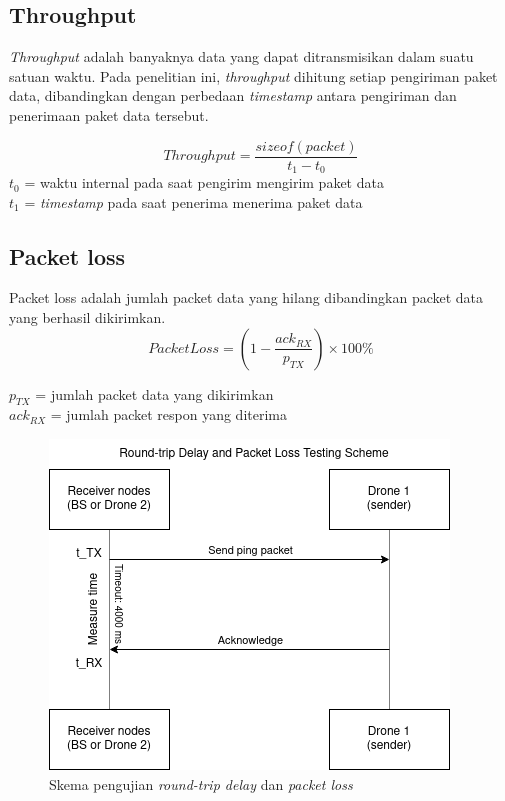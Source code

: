 \subsection{Throughput}
\textit{Throughput} adalah banyaknya data yang dapat ditransmisikan dalam suatu satuan waktu. Pada penelitian ini, \textit{throughput} dihitung setiap pengiriman paket data, dibandingkan dengan perbedaan \textit{timestamp} antara pengiriman dan penerimaan paket data tersebut.

\begin{equation}
	Throughput = \frac{sizeof(packet)}{t_1 - t_0}
\end{equation}
$t_0$ = waktu internal pada saat pengirim mengirim paket data\\
$t_1$ = \textit{timestamp} pada saat penerima menerima paket data

\subsection{Packet loss}
Packet loss adalah jumlah packet data yang hilang dibandingkan packet data yang berhasil dikirimkan.
\begin{equation}
	Packet Loss = (1 - \frac{ack_{RX}}{p_{TX}})\times 100\%
\end{equation}

$p_{TX}$ = jumlah packet data yang dikirimkan\\
$ack_{RX}$ = jumlah packet respon yang diterima

\begin{figure}[H]
	\centering
	\includegraphics[scale=0.7]{./assets/PingTest}
	\caption{Skema pengujian \textit{round-trip delay} dan \textit{packet loss}}
\end{figure}